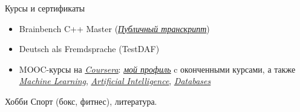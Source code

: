 \documentclass{resume} %
\newcommand{\hreftext}[1]{\underline{\textit{#1}}}
\begin{document}
\begin{rSection}{Курсы и сертификаты}
\begin{itemize}
\item Brainbench C++ Master (\href{http://www.brainbench.com/content/transcript/topicdetail.do?testid=12320176}{\hreftext{Публичный транскрипт}})

\item Deutsch als Fremdsprache (TestDAF)

\item MOOC-курсы на \href{http://coursera.org}{\hreftext{Coursera}}: \href{http://www.coursera.org/user/i/e2d8625ac8ed6c7665b8ad68b990e47b}{\hreftext{мой профиль}} c оконченными курсами, а также \href{http://ml-class.org}{\hreftext{Machine Learning}}, \href{http://ai-class.org}{\hreftext{Artificial Intelligence}}, \href{http://db-class.org}{\hreftext{Databases}} 

\end{itemize}
\end{rSection}


\begin{rSection}{Хобби}
Спорт (бокс, фитнес), литература.
\end{rSection}

\end{document}
